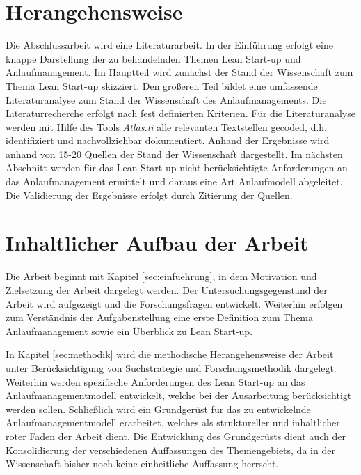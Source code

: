 \section{Herangehensweise}
Die Abschlussarbeit wird eine Literaturarbeit. In der Einführung erfolgt eine knappe Darstellung der zu behandelnden Themen Lean Start-up und Anlaufmanagement. Im Hauptteil wird zunächst der Stand der Wissenschaft zum Thema Lean Start-up skizziert. Den größeren Teil bildet eine umfassende Literaturanalyse zum Stand der Wissenschaft des Anlaufmanagements. Die Literaturrecherche erfolgt nach fest definierten Kriterien. Für die Literaturanalyse werden mit Hilfe des Tools \textit{Atlas.ti} alle relevanten Textstellen gecoded, d.h. identifiziert und nachvollziehbar dokumentiert. Anhand der  Ergebnisse wird anhand von 15-20 Quellen der Stand der Wissenschaft dargestellt. Im nächsten Abschnitt werden für das Lean Start-up nicht berücksichtigte Anforderungen an das Anlaufmanagement ermittelt und daraus eine Art Anlaufmodell abgeleitet. 
%
Die Validierung der Ergebnisse erfolgt durch Zitierung der Quellen. %

\section{Inhaltlicher Aufbau der Arbeit}
Die Arbeit beginnt mit Kapitel \ref{sec:einfuehrung}, in dem Motivation und Zielsetzung der Arbeit dargelegt werden. Der Untersuchungsgegenstand der Arbeit wird aufgezeigt und die Forschungsfragen entwickelt. Weiterhin erfolgen zum Verständnis der Aufgabenstellung eine erste Definition zum Thema Anlaufmanagement sowie ein Überblick zu Lean Start-up.

In Kapitel \ref{sec:methodik} wird die methodische Herangehensweise der Arbeit unter Berücksichtigung von Suchstrategie und Forschungsmethodik dargelegt. 
Weiterhin werden spezifische Anforderungen des Lean Start-up an das Anlaufmanagementmodell entwickelt, welche bei der Ausarbeitung berücksichtigt werden sollen. Schließlich wird ein Grundgerüst für das zu entwickelnde Anlaufmanagementmodell erarbeitet, welches als struktureller und inhaltlicher roter Faden der Arbeit dient. 
Die Entwicklung des Grundgerüsts dient auch der Konsolidierung der verschiedenen Auffassungen des Themengebiets, da in der Wissenschaft bisher noch keine einheitliche Auffassung herrscht. 

